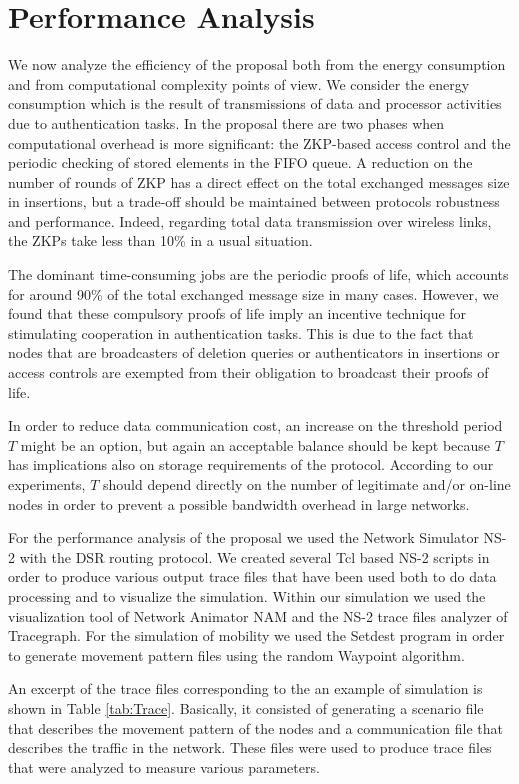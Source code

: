 \documentclass{article}
\begin{document}
\section{Performance Analysis}
\label{PerformanceAnalysis}
We now analyze the efficiency of the proposal both from the energy
consumption and from computational complexity points of view. We
consider the energy consumption which is the result of
transmissions of data and processor activities due to
authentication tasks. In the proposal there are two phases when
computational overhead is more significant: the ZKP-based access
control and the periodic checking of stored elements in the FIFO queue. A
reduction on the number of rounds of ZKP has a direct effect on
the total exchanged messages size in insertions, but a trade-off
should be maintained between protocols robustness and performance.
Indeed, regarding total data transmission over wireless links, the
ZKPs take less than 10\% in a usual situation.

The dominant time-consuming jobs are the periodic proofs of life, which accounts for around 90\% of the
total exchanged message size in many cases. However, we found
that these compulsory proofs of life imply an incentive technique
for stimulating cooperation in authentication tasks. This is due
to the fact that nodes that are broadcasters of deletion queries or
authenticators in insertions or access controls  are exempted from
their obligation to broadcast their proofs of life.

In order to reduce  data communication cost, an
increase on the threshold period $T$ might be an option, but again
an acceptable balance should be kept because $T$ has implications also on storage requirements of the protocol. According to our
experiments, $T$ should depend directly on the number of
legitimate and/or on-line nodes in order to prevent a possible
bandwidth overhead in large networks.

For the performance analysis of the proposal we used the Network
Simulator NS-2 with the DSR routing protocol.  We created several Tcl
based NS-2 scripts in order to produce various output trace files
that have been used both to do data processing and to visualize
the simulation. Within our simulation we  used the visualization
tool of Network Animator NAM  and the NS-2 trace files analyzer of
Tracegraph. For the simulation of mobility we used the Setdest
program in order to generate movement pattern files using the
random Waypoint algorithm.

An excerpt of the trace files corresponding to the
an example of simulation is shown in Table \ref{tab:Trace}.
Basically, it consisted of generating a scenario file that
describes the movement pattern of the nodes and a communication
file that describes the traffic in the network. These files were
used to produce trace files that were analyzed to measure various
parameters. 
\end{document}
